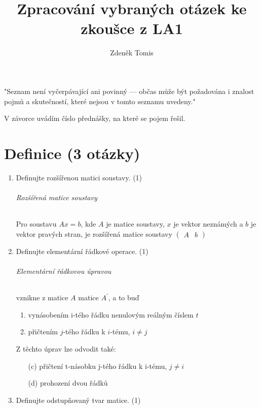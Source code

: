 \documentclass[10pt,a4paper]{article}
\title{Zpracování vybraných otázek ke zkoušce z LA1}
\date{}
\author{Zdeněk Tomis}
\begin{document}
\maketitle

"Seznam  není  vyčerpávající  ani  povinný  —  občas  může  být  požadována  i  znalost pojmů a skutečností, které nejsou v tomto seznamu uvedeny."

\hfill

V závorce uvádím číslo přednášky, na které se pojem řešil.

\part{Definice (3 otázky)}

\begin{enumerate}
\item Definujte rozšířenou matici soustavy. (1)

\paragraph{Rozšířená matice soustavy}
Pro soustavu $Ax = b$, kde $A$ je matice soustavy, $x$ je vektor neznámých a $b$ je vektor pravých stran, je rozšířená matice soustavy $\left(\begin{array}{c|c}
A & b
\end{array}\right)$

\item Definujte elementární řádkové operace. (1)
\paragraph{Elementární řádkovou úpravou} vznikne z matice $A$ matice $A^\prime$, a to buď

\begin{enumerate}
\item vynásobením i-tého řádku nenulovým reálným číslem $t$
\item přičtením $j$-tého řádku k $i$-tému, $i \neq j$
\end{enumerate}
Z těchto úprav lze odvodit také:	
\begin{enumerate}
\item[(c)] přičtení t-násobku j-tého řádku k i-tému, $j \neq i$
\item[(d)] prohození dvou řádků
\end{enumerate}

\item Definujte odstupňovaný tvar matice. (1)

\end{enumerate}
\end{document}
